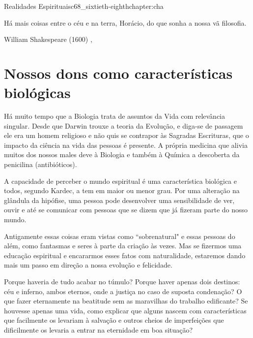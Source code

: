\begin{chapterpage}{Realidades Espirituais}{c68_sixtieth-eighthchapter:cha}
 
\begin{myquotation}Há mais coisas entre o céu e na terra, Horácio, do que sonha a nossa vã filosofia.
\par\vspace*{15mm}
\mbox{}\hfill \emdash{}William Shakespeare (1600)
, %
\par\end{myquotation}

\end{chapterpage}



\section{Nossos dons como características biológicas}\label{c1_basicformatting:sec}

\emdash{}Há muito tempo que a Biologia trata de assuntos da Vida com relevância singular. Desde que Darwin trouxe a teoria da Evolução, e diga-se de passagem ele era um homem religioso e não quis se contrapor às Sagradas Escrituras, que o impacto da ciência na vida das pessoas é presente. A própria medicina que alivia muitos dos nossos males deve à Biologia e também à Química a descoberta da penicilina (antibióticos).

\emdash{}A capacidade de perceber o mundo espiritual é uma característica biológica e todos, segundo Kardec, a tem em maior ou menor grau. Por uma alteração na glândula da hipófise, uma pessoa pode desenvolver uma sensibilidade de ver, ouvir e até se comunicar com pessoas que se dizem que já fizeram parte do nosso mundo.

\emdash{}Antigamente essas coisas eram vistas como ``sobrenatural" e essas pessoas do além, como fantasmas e seres à parte da criação às vezes. Mas se fizermos uma educação espiritual e encararmos esses fatos com naturalidade, estaremos dando mais um passo em direção a nossa evolução e felicidade.

\emdash{}Porque haveria de tudo acabar no túmulo? Porque haver apenas dois destinos: céu e inferno, ambos eternos, onde a justiça no caso de suposta condenação? O que fazer eternamente na beatitude sem as maravilhas do trabalho edificante? Se houvesse apenas uma vida, como explicar que alguns nascem com características que facilmente os levariam à salvação e outros cheios de imperfeições que dificilmente os levaria a entrar na eternidade em boa situação?


